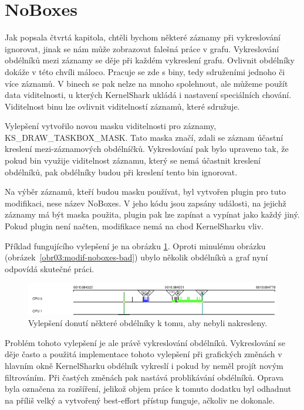 \section{NoBoxes}

Jak popsala čtvrtá kapitola, chtěli bychom některé záznamy při vykreslování ignorovat, jinak se nám může zobrazovat falešná práce v grafu. Vykreslování obdélníků mezi záznamy se děje při každém vykreslení grafu. Ovlivnit obdélníky dokáže v této chvíli máloco. Pracuje se zde s biny, tedy sdruženími jednoho či více záznamů. V binech se pak nelze na mnoho spolehnout, ale můžeme použít data viditelnosti, u kterých KernelShark ukládá i nastavení speciálních chování. Viditelnost binu lze ovlivnit viditelností záznamů, které sdružuje.

Vylepšení vytvořilo novou masku viditelnosti pro záznamy, KS\_DRAW\_TASKBOX\_MASK. Tato maska značí, zdali se záznam účastní kreslení mezi-záznamových obdélníčků. Vykreslování pak bylo upraveno tak, že pokud bin využije viditelnost záznamu, který se nemá účastnit kreslení obdélníků, pak obdélníky budou při kreslení tento bin ignorovat.

Na výběr záznamů, kteří budou masku používat, byl vytvořen plugin pro tuto modifikaci, nese název NoBoxes. V jeho kódu jsou zapsány události, na jejichž záznamy má být maska použita, plugin pak lze zapínat a vypínat jako každý jiný. Pokud plugin není načten, modifikace nemá na chod KernelSharku vliv.

Příklad fungujícího vylepšení je na obrázku \ref{obr04:modif-noboxes-good}. Oproti minulému obrázku (obrázek~\ref{obr03:modif-noboxes-bad}) ubylo několik obdélníků a graf nyní odpovídá skutečné práci.

\begin{figure}[p]\centering
    \includegraphics[width=140mm]{img/Modifikace/modif-noboxes-good}
    \caption{Vylepšení donutí některé obdélníky k tomu, aby nebyli nakresleny.}
    \label{obr04:modif-noboxes-good}
\end{figure}

Problém tohoto vylepšení je ale právě vykreslování obdélníků. Vykreslování se děje často a použitá implementace tohoto vylepšení při grafických změnách v hlavním okně KernelSharku obdélník vykreslí i pokud by neměl projít novým filtrováním. Při častých změnách pak nastává problikávání obdélníků. Oprava byla označena za rozšíření, jelikož objem práce k tomuto dodatku byl odhadnut na příliš velký a vytvořený best-effort přístup funguje, ačkoliv ne dokonale.